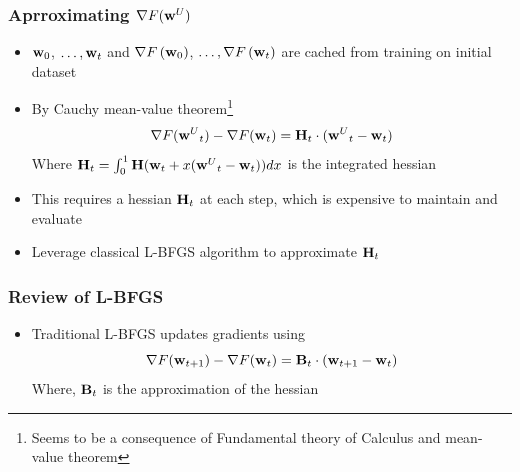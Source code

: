 \documentclass{beamer}
\begin{document}
\begin{frame}
  \frametitle{Aprroximating $\nabla F({\textbf{w}^{U}})$}
  \begin{itemize}
    \item $\textbf{w}_{0}$, $\dots,\textbf{w}_{t}$ and $\nabla F\left(\textbf{w}_{0}\right)$, $\dots, \nabla F\left(\textbf{w}_{t}\right)$ are cached from training on initial dataset
    \item By Cauchy mean-value theorem\footnote<2->{Seems to be a consequence of Fundamental theory of Calculus and mean-value theorem}
    \[
      \nabla F({\textbf{w}^{U}}_{t}) - \nabla F(\textbf{w}_{t}) = \textbf{H}_{t} \cdot ({\textbf{w}^{U}}_{t} - \textbf{w}_{t}) 
    \]
    Where $\textbf{H}_{t} = \int_{0}^{1}\textbf{H}(\textbf{w}_{t}+x({\textbf{w}^{U}}_{t}-\textbf{w}_{t}))dx$ is the integrated hessian
    \item This requires a hessian $\textbf{H}_{t}$ at each step, which is expensive to maintain and evaluate
    \item Leverage classical L-BFGS algorithm to approximate $\textbf{H}_{t}$
  \end{itemize}
\end{frame}

\begin{frame}
  \frametitle{Review of L-BFGS}
  \begin{itemize}
    \item Traditional L-BFGS updates gradients using
    \[\nabla F(\textbf{w}_{t+1}) - \nabla F(\textbf{w}_{t})  = \textbf{B}_{t} \cdot (\textbf{w}_{t+1}-\textbf{w}_{t}) \]
    Where, $\textbf{B}_t$ is the approximation of the hessian
  \end{itemize}
  \vfill
  \hfill%
\end{frame}
\end{document}
